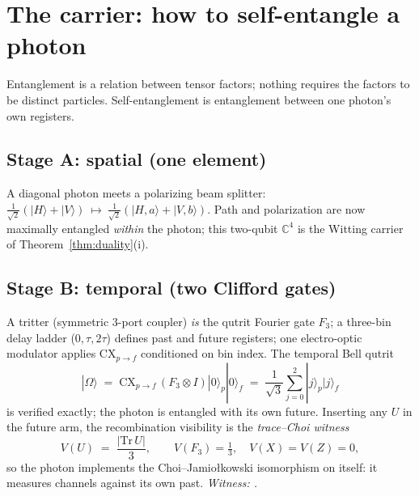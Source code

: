 \documentclass[11pt]{article}
\newcommand{\ket}[1]{|#1\rangle}
\begin{document}
\section{The carrier: how to self-entangle a photon}
\label{sec:carrier}

Entanglement is a relation between tensor factors; nothing requires
the factors to be distinct particles.  Self-entanglement is
entanglement between one photon's own registers.

\subsection{Stage A: spatial (one element)}
A diagonal photon meets a polarizing beam splitter:
$\tfrac1{\sqrt2}(\ket{H}+\ket{V})\ \mapsto\
\tfrac1{\sqrt2}(\ket{H,a}+\ket{V,b})$.
Path and polarization are now maximally entangled \emph{within} the
photon; this two-qubit $\mathbb{C}^4$ is the Witting carrier of
Theorem~\ref{thm:duality}(i).

\subsection{Stage B: temporal (two Clifford gates)}
A tritter (symmetric $3$-port coupler) \emph{is} the qutrit Fourier
gate $F_3$; a three-bin delay ladder ($0,\tau,2\tau$) defines past and
future registers; one electro-optic modulator applies
$\mathrm{CX}_{p\to f}$ conditioned on bin index.  The temporal Bell
qutrit
\[
\ket{\Omega}\;=\;\mathrm{CX}_{p\to f}\,(F_3\otimes I)\ket{0}_p\ket{0}_f
\;=\;\frac1{\sqrt3}\sum_{j=0}^{2}\ket{j}_p\ket{j}_f
\]
is verified exactly; the photon is entangled with its own future.
Inserting any $U$ in the future arm, the recombination visibility is
the \emph{trace--Choi witness}
\[
V(U)\;=\;\frac{|\mathrm{Tr}\,U|}{3},\qquad
V(F_3)=\tfrac13,\quad V(X)=V(Z)=0,
\]
so the photon implements the Choi--Jamio{\l}kowski isomorphism on
itself: it measures channels against its own past.
\emph{Witness: .}
\end{document}
